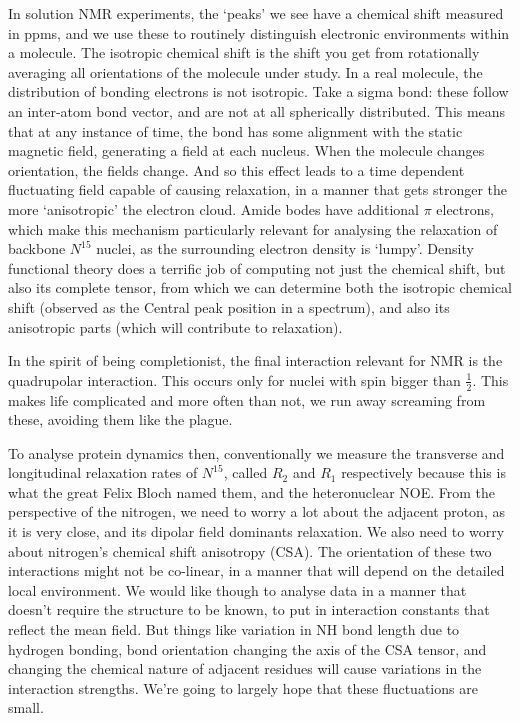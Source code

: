 \documentclass[showkeys,aps,prb,prepreint,amssymb, amsmath,nobibnotes]{article}
\begin{document}
  In solution NMR experiments, the `peaks' we see have a chemical shift measured in ppms, and we use these to routinely distinguish electronic environments within a molecule. The isotropic chemical shift is the shift you get from rotationally averaging all orientations of the molecule under study. In a real molecule, the distribution of bonding electrons is not isotropic. Take a sigma bond: these follow an inter-atom bond vector, and are not at all spherically distributed. This means that at any instance of time, the bond has some alignment with the static magnetic field, generating a field at each nucleus. When the molecule changes orientation, the fields change. And so this effect leads to a time dependent fluctuating field capable of causing relaxation, in a manner that gets stronger the more `anisotropic' the electron cloud. Amide bodes have additional $\pi$ electrons, which make this mechanism particularly relevant for analysing the relaxation of backbone $N^{15}$ nuclei, as the surrounding electron density is `lumpy'. Density functional theory does a terrific job of computing not just the chemical shift, but also its complete tensor, from which we can determine both the isotropic chemical shift (observed as the Central peak position in a spectrum), and also its anisotropic parts (which will contribute to relaxation).

  In the spirit of being completionist, the final interaction relevant for NMR is the quadrupolar interaction. This occurs only for nuclei with spin bigger than $\frac{1}{2}$. This makes life complicated and more often than not, we run away screaming from these, avoiding them like the plague.

  To analyse protein dynamics then, conventionally we measure the transverse and longitudinal relaxation rates of $N^{15}$, called $R_2$ and $R_1$ respectively because this is what the great Felix Bloch named them, and the heteronuclear NOE. From the perspective of the nitrogen, we need to worry a lot about the adjacent proton, as it is very close, and its dipolar field dominants relaxation. We also need to worry about nitrogen's chemical shift anisotropy (CSA). The orientation of these two interactions might not be co-linear, in a manner that will depend on the detailed local environment. We would like though to analyse data in a manner that doesn't require the structure to be known, to put in interaction constants that reflect the mean field. But things like variation in NH bond length due to hydrogen bonding, bond orientation changing the axis of the CSA tensor, and changing the chemical nature of adjacent residues will cause variations in the interaction strengths. We're going to largely hope that these fluctuations are small.
  
\end{document}
